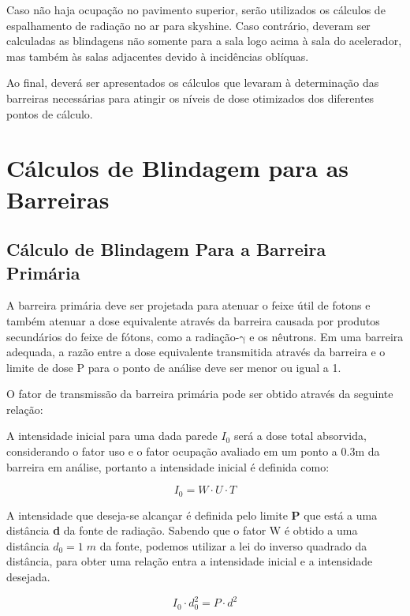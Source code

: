 \documentclass[11pt,a4paper]{article}
\begin{document}
            Caso não haja ocupação no pavimento superior, serão utilizados os cálculos de espalhamento de radiação no ar para skyshine. Caso contrário, deveram ser calculadas as blindagens não somente para a sala logo acima à sala do acelerador, mas também às salas adjacentes devido à incidências oblíquas.

            Ao final, deverá ser apresentados os cálculos que levaram à determinação das barreiras necessárias para atingir os níveis de dose otimizados dos diferentes pontos de cálculo.

    \section{Cálculos de Blindagem para as Barreiras}

        \subsection{Cálculo de Blindagem Para a Barreira Primária}
            
            A barreira primária deve ser projetada para atenuar o feixe útil de fotons e também atenuar a dose equivalente através da barreira causada por produtos secundários do feixe de fótons, como a radiação-$\mathrm{\gamma}$ e os nêutrons. Em uma barreira adequada, a razão entre a dose equivalente transmitida através da barreira e o limite de dose P para o ponto de análise deve ser menor ou igual a 1.


            O fator de transmissão da barreira primária pode ser obtido através da seguinte relação:

            A intensidade inicial para uma dada parede $I_0$ será a dose total absorvida, considerando o fator uso e o fator ocupação avaliado em um ponto a 0.3m da barreira em análise, portanto a intensidade inicial é definida como:
            
            \begin{equation}
                I_0 = W \cdot U \cdot T
            \end{equation}

            A intensidade que deseja-se alcançar é definida pelo limite \textbf{P} que está a uma distância \textbf{d} da fonte de radiação. Sabendo que o fator W é obtido a uma distância $d_0 = 1 \; m$ da fonte, podemos utilizar a lei do inverso quadrado da distância, para obter uma relação entra a intensidade inicial e a intensidade desejada. 

            
                $$I_0 \cdot d_0^2 = P \cdot d^2$$
            
\end{document}
